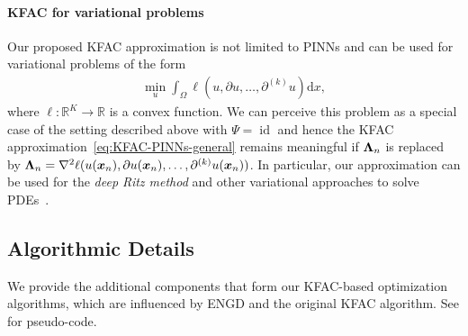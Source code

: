 \paragraph{KFAC for variational problems}
Our proposed KFAC approximation is not limited to PINNs and can be used for variational problems of the form
\begin{align}
    \min_u \int_\Omega \ell(u, \partial u, \dots, \partial^{(k)} u) \mathrm{d}x,
\end{align}
where $\ell\colon\mathbb R^K\to\mathbb R$ is a convex function.
We can perceive this problem as a special case of the setting described above with $\Psi = \operatorname{id}$ and hence the KFAC approximation~\eqref{eq:KFAC-PINNs-general} remains meaningful %
if ${\bm{\Lambda}}_n$ is replaced by ${\bm{\Lambda}}_n = \nabla^2\ell(u({\bm{x}}_n), \partial u({\bm{x}}_n), \dots, \partial^{(k)}u({\bm{x}}_n))$.
In particular, our approximation can be used for the \emph{deep Ritz method} and other variational approaches to solve PDEs~\citep{yu2018deep}.

\begin{comment}
    \subsection{Computational complexity}
\todo[inline]{what can we say? probably better to move to the respective approximations}
\begin{itemize}
    \item GN: $O(p^3+Np^2)$
    \item BFGS: $O(p^2+?)$
    \item L-BFGS: $O(mp+?)$?
    \item KFAC: $O(?)$
    \item
\end{itemize}
\end{comment}

\subsection{Algorithmic Details}

We provide the additional components that form our KFAC-based optimization algorithms, which are influenced by ENGD and the original KFAC algorithm.
See  for pseudo-code.

